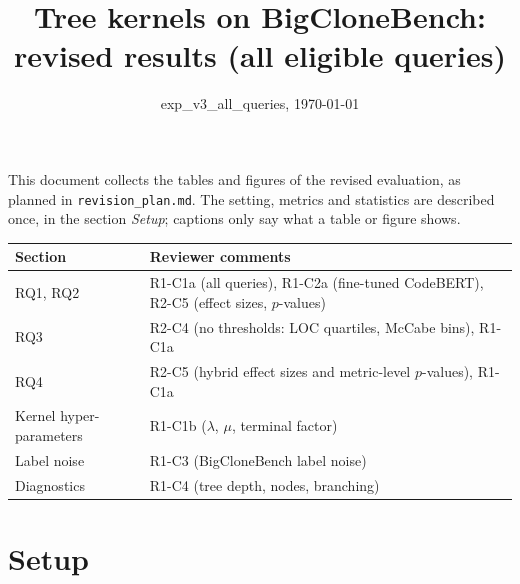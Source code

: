 \documentclass[10pt]{article}
\title{Tree kernels on BigCloneBench: revised results (all eligible queries)}
\date{exp\_v3\_all\_queries, \today}
\begin{document}
\maketitle

\noindent This document collects the tables and figures of the revised evaluation, as planned in
\texttt{revision\_plan.md}. The setting, metrics and statistics are described once, in the section \emph{Setup};
captions only say what a table or figure shows.

\medskip
\noindent\begin{tabular}{@{}ll@{}}
\toprule
Section & Reviewer comments \\
\midrule
RQ1, RQ2 & R1-C1a (all queries), R1-C2a (fine-tuned CodeBERT), R2-C5 (effect sizes, $p$-values) \\
RQ3 & R2-C4 (no thresholds: LOC quartiles, McCabe bins), R1-C1a \\
RQ4 & R2-C5 (hybrid effect sizes and metric-level $p$-values), R1-C1a \\
Kernel hyper-parameters & R1-C1b ($\lambda$, $\mu$, terminal factor) \\
Label noise & R1-C3 (BigCloneBench label noise) \\
Diagnostics & R1-C4 (tree depth, nodes, branching) \\
\bottomrule
\end{tabular}

\FloatBarrier\clearpage
\section*{Setup}


\end{document}
